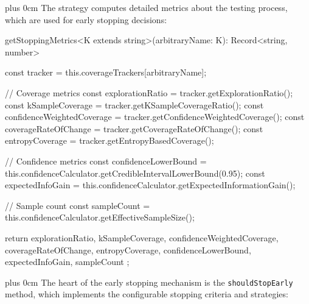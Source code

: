 \documentclass[11pt,a4paper]{article}
\newcommand{\justifytext}{\leftskip=0pt \rightskip=0pt plus 0cm}
\begin{document}
\justifytext
The strategy computes detailed metrics about the testing process, which are used for early stopping decisions:

\begin{wrappedcode}
    getStoppingMetrics<K extends string>(arbitraryName: K): Record<string, number> {
      const tracker = this.coverageTrackers[arbitraryName];
      
      // Coverage metrics
      const explorationRatio = tracker.getExplorationRatio();
      const kSampleCoverage = tracker.getKSampleCoverageRatio();
      const confidenceWeightedCoverage = tracker.getConfidenceWeightedCoverage();
      const coverageRateOfChange = tracker.getCoverageRateOfChange();
      const entropyCoverage = tracker.getEntropyBasedCoverage();
      
      // Confidence metrics
      const confidenceLowerBound = 
        this.confidenceCalculator.getCredibleIntervalLowerBound(0.95);
      const expectedInfoGain = 
        this.confidenceCalculator.getExpectedInformationGain();
        
      // Sample count
      const sampleCount = this.confidenceCalculator.getEffectiveSampleSize();
      
      return {
        explorationRatio,
        kSampleCoverage,
        confidenceWeightedCoverage,
        coverageRateOfChange,
        entropyCoverage,
        confidenceLowerBound,
        expectedInfoGain,
        sampleCount
      };
    }
\end{wrappedcode}

\justifytext
The heart of the early stopping mechanism is the \texttt{shouldStopEarly} method, which implements the configurable stopping criteria and strategies:
\end{document}
